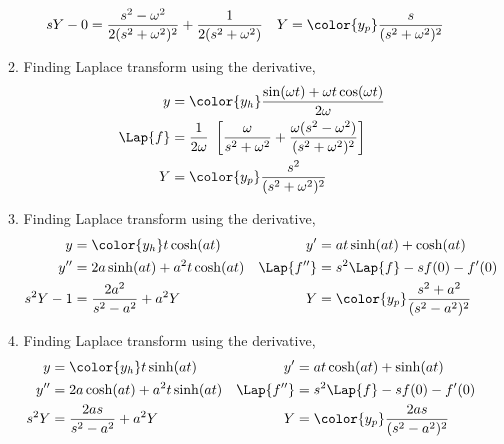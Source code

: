 \begin{enumerate}
\begin{enumerate}
\begin{align}
                        sY - 0               & = \frac{s^2 - \omega^2}
                        {2(s^2 + \omega^2)^2}
                        + \frac{1}
                        {2(s^2 + \omega^2 )} &
                        Y                    & = \color{y_p}\frac{s}
                        {(s^2+\omega^2)^2}
                    \end{align}
              \item Finding Laplace transform using the derivative,
                    \begin{align}
                        y         & = \color{y_h} \frac{\sin(\omega t)
                            + \omega t\cos(\omega t)}
                        {2\omega}                                                  \\
                        \Lap\{f\} & = \frac{1}{2\omega}\ \left[
                            \frac{\omega}{s^2 + \omega^2}
                        + \frac{\omega(s^2 - \omega^2)}{(s^2 + \omega^2)^2}\right] \\
                        Y         & = \color{y_p}\frac{s^2}
                        {(s^2 + \omega^2)^2}
                    \end{align}
              \item Finding Laplace transform using the derivative,
                    \begin{align}
                        y           & = \color{y_h} t\cosh(at)       &
                        y'          & = at\sinh(at) + \cosh(at)        \\
                        y''         & = 2a\sinh(at) + a^2t\cosh(at)  &
                        \Lap\{f''\} & = s^2\Lap\{f\} - sf(0) - f'(0)   \\
                        s^2Y - 1    & = \frac{2a^2}{s^2 - a^2}
                        + a^2Y      &
                        Y           & = \color{y_p}\frac{s^2+a^2}
                        {(s^2 - a^2)^2}
                    \end{align}
              \item Finding Laplace transform using the derivative,
                    \begin{align}
                        y           & = \color{y_h} t\sinh(at)       &
                        y'          & = at\cosh(at) + \sinh(at)        \\
                        y''         & = 2a\cosh(at) + a^2t\sinh(at)  &
                        \Lap\{f''\} & = s^2\Lap\{f\} - sf(0) - f'(0)   \\
                        s^2Y        & = \frac{2as}{s^2 - a^2} + a^2Y &
                        Y           & = \color{y_p}\frac{2as}
                        {(s^2 - a^2)^2}
                    \end{align}
          \end{enumerate}


\end{enumerate}
